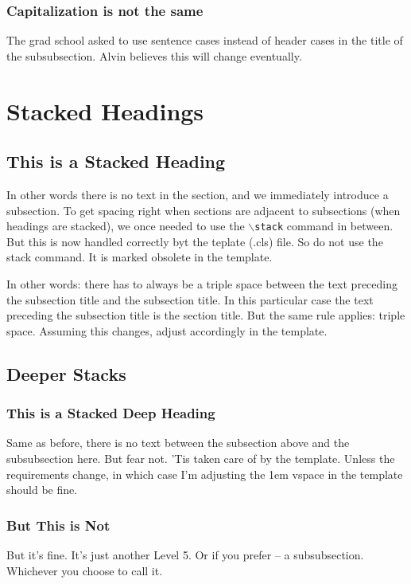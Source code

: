 \subsubsection{Capitalization is not the same}
The grad school asked to use sentence cases instead of header cases in the title of the subsubsection.
Alvin believes this will change eventually.

\section{Stacked Headings}


\subsection{This is a Stacked Heading}
In other words there is no text in the section, and we immediately introduce a subsection.
To get spacing right when sections are adjacent to subsections (when headings are stacked),
we once needed to use the \texttt{$\backslash$stack} command in between.
But this is now handled correctly byt the teplate (.cls) file. So do not use the stack command.
It is marked obsolete in the template.

In other words: there has to always be a triple space between the text preceding the subsection title and the subsection title.
In this particular case the text preceding the subsection title is the section title.
But the same rule applies: triple space.
Assuming this changes, adjust accordingly in the template.

\subsection{Deeper Stacks}


\subsubsection{This is a Stacked Deep Heading}
Same as before, there is no text between the subsection above and the subsubsection here.
But fear not. 'Tis taken care of by the template.
Unless the requirements change, in which case I'm adjusting the 1em vspace in the template should be fine.

\subsubsection{But This is Not}
But it's fine. It's just another Level 5. Or if you prefer -- a subsubsection. Whichever you choose to call it.
